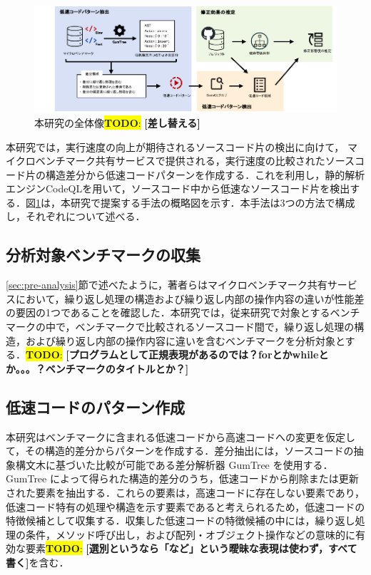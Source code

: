 \documentclass[submit,techrep,noauthor]{ipsj}
\newcommand{\todo}[1]{\colorbox{yellow}{{\bf TODO}:}{\color{red} {\textbf{[#1]}}}}
\begin{document}
\begin{figure}[t]
    \centering
    \includegraphics[width=1.0\linewidth]{./Noguchi_fig/approach_abst.pdf}
    \caption{本研究の全体像\todo{差し替える}}
    \label{fig:Approach}
\end{figure}

本研究では，実行速度の向上が期待されるソースコード片の検出に向けて，
マイクロベンチマーク共有サービスで提供される，実行速度の比較されたソースコード片の構造差分から低速コードパターンを作成する．これを利用し，静的解析エンジンCodeQLを用いて，ソースコード中から低速なソースコード片を検出する．図\ref{fig:Approach}は，本研究で提案する手法の概略図を示す．本手法は3つの方法で構成し，それぞれについて述べる．


\subsection{分析対象ベンチマークの収集}

\ref{sec:pre-analysis}節で述べたように，著者らはマイクロベンチマーク共有サービスにおいて，繰り返し処理の構造および繰り返し内部の操作内容の違いが性能差の要因の1つであることを確認した．本研究では，従来研究で対象とするベンチマークの中で，ベンチマークで比較されるソースコード間で，繰り返し処理の構造，および繰り返し内部の操作内容に違いを含むベンチマークを分析対象とする．\todo{プログラムとして正規表現があるのでは？forとかwhileとか。。。？ベンチマークのタイトルとか？}


\subsection{低速コードのパターン作成}
本研究はベンチマークに含まれる低速コードから高速コードへの変更を仮定して，その構造的差分からパターンを作成する．差分抽出には，ソースコードの抽象構文木に基づいた比較が可能である差分解析器 GumTree\cite{gumtree} を使用する．GumTree によって得られた構造的差分のうち，低速コードから削除または更新された要素を抽出する．これらの要素は，高速コードに存在しない要素であり，低速コード特有の処理や構造を示す要素であると考えられるため，低速コードの特徴候補として収集する．収集した低速コードの特徴候補の中には，繰り返し処理の条件，メソッド呼び出し，および配列・オブジェクト操作などの意味的に有効な要素\todo{選別というなら「など」という曖昧な表現は使わず，すべて書く}を含む．
\end{document}
